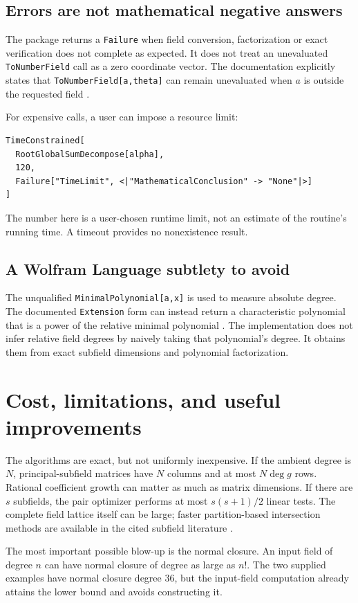 \documentclass[11pt,a4paper]{article}
\newcommand{\code}[1]{\texttt{#1}}
\theoremstyle{remark}\newtheorem{remark}[theorem]{Remark}
\begin{document}
\subsection{Errors are not mathematical negative answers}
The package returns a \code{Failure} when field conversion, factorization or exact verification does not complete as expected. It does not treat an unevaluated \code{ToNumberField} call as a zero coordinate vector. The documentation explicitly states that \code{ToNumberField[a,theta]} can remain unevaluated when $a$ is outside the requested field \cite{tonumberfield}.

For expensive calls, a user can impose a resource limit:
\begin{lstlisting}
TimeConstrained[
  RootGlobalSumDecompose[alpha],
  120,
  Failure["TimeLimit", <|"MathematicalConclusion" -> "None"|>]
]
\end{lstlisting}
The number here is a user-chosen runtime limit, not an estimate of the routine's running time. A timeout provides no nonexistence result.

\subsection{A Wolfram Language subtlety to avoid}
The unqualified \code{MinimalPolynomial[a,x]} is used to measure absolute degree. The documented \code{Extension} form can instead return a characteristic polynomial that is a power of the relative minimal polynomial \cite{minpoly}. The implementation does not infer relative field degrees by naively taking that polynomial's degree. It obtains them from exact subfield dimensions and polynomial factorization.

\section{Cost, limitations, and useful improvements}
\label{sec:complexity}
The algorithms are exact, but not uniformly inexpensive. If the ambient degree is $N$, principal-subfield matrices have $N$ columns and at most $N\deg g$ rows. Rational coefficient growth can matter as much as matrix dimensions. If there are $s$ subfields, the pair optimizer performs at most $s(s+1)/2$ linear tests. The complete field lattice itself can be large; faster partition-based intersection methods are available in the cited subfield literature \cite{subfields}.

The most important possible blow-up is the normal closure. An input field of degree $n$ can have normal closure of degree as large as $n!$. The two supplied examples have normal closure degree $36$, but the input-field computation already attains the lower bound and avoids constructing it.
\end{document}
